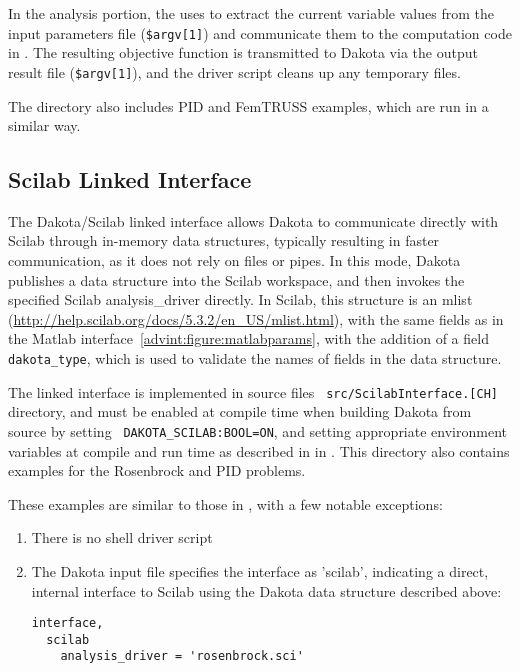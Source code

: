 In the analysis portion, the 
uses  to extract the current
variable values from the input parameters file (\texttt{\$argv[1]})
and communicate them to the computation code in
. The resulting objective function is
transmitted to Dakota via the output result file (\texttt{\$argv[1]}),
and the driver script cleans up any temporary files.

The directory also includes PID and FemTRUSS examples, which are run
in a similar way.

\subsection{Scilab Linked Interface} 

The Dakota/Scilab linked interface allows Dakota to communicate
directly with Scilab through in-memory data structures, typically
resulting in faster communication, as it does not rely on files or
pipes. In this mode, Dakota publishes a data structure into the
Scilab workspace, and then invokes the specified Scilab
analysis\_driver directly. In Scilab, this structure is an mlist
(\url{http://help.scilab.org/docs/5.3.2/en\_US/mlist.html}), with the same
fields as in the Matlab interface~\ref{advint:figure:matlabparams},
with the addition of a field {\tt dakota\_type}, which is used to validate
the names of fields in the data structure.

The linked interface is implemented in source files {\tt
  src/ScilabInterface.[CH]} directory, and must be enabled at compile
time when building Dakota from source by setting {\tt
  DAKOTA\_SCILAB:BOOL=ON}, and setting appropriate environment
variables at compile and run time as described in 
in . This directory also
contains examples for the Rosenbrock and PID problems.

These examples are similar to those in , with
a few notable exceptions:
\begin{enumerate}
\item There is no shell driver script
\item The Dakota input file specifies the interface as 'scilab',
  indicating a direct, internal interface to Scilab using the Dakota
  data structure described above:
\begin{small}
\begin{verbatim}
interface,
  scilab
    analysis_driver = 'rosenbrock.sci'
\end{verbatim} 
\end{small}
\end{enumerate}


